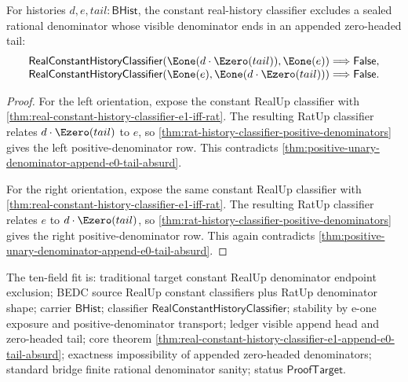 \begin{theorem}
\label{thm:real-constant-history-classifier-e1-append-e0-tail-absurd}
For histories $d,e,tail:\mathsf{BHist}$, the constant real-history classifier
excludes a sealed rational denominator whose visible denominator ends in an
appended zero-headed tail:
$$
\begin{array}{l}
\mathsf{RealConstantHistoryClassifier}(\Eone(d\cdot\Ezero(tail)),\Eone(e))
\Longrightarrow\mathsf{False},\\
\mathsf{RealConstantHistoryClassifier}(\Eone(e),\Eone(d\cdot\Ezero(tail)))
\Longrightarrow\mathsf{False}.
\end{array}
$$
\end{theorem}
\begin{proof}
For the left orientation, expose the constant RealUp classifier with
\autoref{thm:real-constant-history-classifier-e1-iff-rat}. The resulting
RatUp classifier relates $d\cdot\Ezero(tail)$ to $e$, so
\autoref{thm:rat-history-classifier-positive-denominators} gives the left
positive-denominator row. This contradicts
\autoref{thm:positive-unary-denominator-append-e0-tail-absurd}.

For the right orientation, expose the same constant RealUp classifier with
\autoref{thm:real-constant-history-classifier-e1-iff-rat}. The resulting
RatUp classifier relates $e$ to $d\cdot\Ezero(tail)$, so
\autoref{thm:rat-history-classifier-positive-denominators} gives the right
positive-denominator row. This again contradicts
\autoref{thm:positive-unary-denominator-append-e0-tail-absurd}.
\end{proof}

The ten-field fit is: traditional target constant RealUp denominator endpoint
exclusion; BEDC source RealUp constant classifiers plus RatUp denominator
shape; carrier $\mathsf{BHist}$; classifier
$\mathsf{RealConstantHistoryClassifier}$; stability by e-one exposure and
positive-denominator transport; ledger visible append head and zero-headed
tail; core theorem
\autoref{thm:real-constant-history-classifier-e1-append-e0-tail-absurd};
exactness impossibility of appended zero-headed denominators; standard bridge
finite rational denominator sanity; status $\mathsf{ProofTarget}$.

